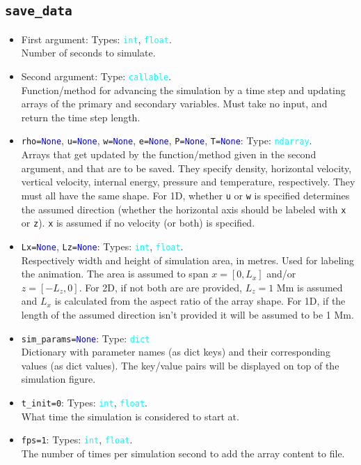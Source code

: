 \documentclass{article}
\newcommand{\ttt}[1]{\texttt{#1}}
\newcommand{\ptype}[1]{\texttt{\textcolor{cyan}{#1}}}
\newcommand{\cbl}[1]{\textcolor{blue}{#1}}
\newcommand{\cro}[1]{\textcolor{RedOrange}{#1}}
\begin{document}
\subsection{\ttt{save\_data}}
\label{sec:sd}
\begin{itemize}
	\item First argument: Types: \ptype{int}, \ptype{float}.\\Number of seconds to simulate.
	\item Second argument: Type: \ptype{callable}.\\Function/method for advancing the simulation by a time step and updating arrays of the primary and secondary variables. Must take no input, and return the time step length.
	\item \ttt{\cro{rho}=\cbl{None}}, \ttt{\cro{u}=\cbl{None}}, \ttt{\cro{w}=\cbl{None}}, \ttt{\cro{e}=\cbl{None}}, \ttt{\cro{P}=\cbl{None}}, \ttt{\cro{T}=\cbl{None}}: Type: \ptype{ndarray}.\\Arrays that get updated by the function/method given in the second argument, and that are to be saved. They specify density, horizontal velocity, vertical velocity, internal energy, pressure and temperature, respectively. They must all have the same shape. For 1D, whether \ttt{u} or \ttt{w} is specified determines the assumed direction (whether the horizontal axis should be labeled with \ttt{x} or \ttt{z}). \ttt{x} is assumed if no velocity (or both) is specified.
	\item \ttt{\cro{Lx}=\cbl{None}}, \ttt{\cro{Lz}=\cbl{None}}: Types: \ptype{int}, \ptype{float}.\\Respectively width and height of simulation area, in metres. Used for labeling the animation. The area is assumed to span $x=[0, L_x]$ and/or $z=[-L_z, 0]$. For 2D, if not both are are provided, $L_z = 1$ Mm is assumed and $L_x$ is calculated from the aspect ratio of the array shape. For 1D, if the length of the assumed direction isn't provided it will be assumed to be 1 Mm.
	\item \ttt{\cro{sim\_params}=\cbl{None}}: Type: \ptype{dict}\\Dictionary with parameter names (as dict keys) and their corresponding values (as dict values). The key/value pairs will be displayed on top of the simulation figure.
	\item \ttt{\cro{t\_init}=0}: Types: \ptype{int}, \ptype{float}.\\What time the simulation is considered to start at.
	\item \ttt{\cro{fps}=1}: Types: \ptype{int}, \ptype{float}.\\The number of times per simulation second to add the array content to file.

\end{itemize}
\end{document}
